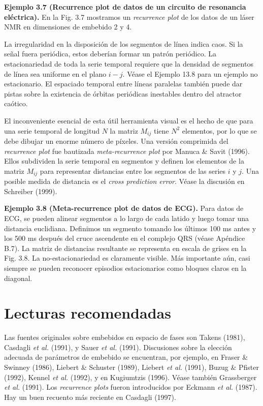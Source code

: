 \documentclass[10pt,a4paper]{book}
\begin{document}
\newpage

\textbf{Ejemplo 3.7 (Recurrence plot de datos de un circuito de resonancia eléctrica).} En la Fig. 3.7 mostramos un \textit{recurrence plot} de los datos de un láser NMR en dimensiones de embebido 2 y 4.

La irregularidad en la disposición de los segmentos de línea indica caos. Si la señal fuera periódica, estos deberían formar un patrón periódico. La estacionariedad de toda la serie temporal requiere que la densidad de segmentos de línea sea uniforme en el plano $i-j$. Véase el Ejemplo 13.8 para un ejemplo no estacionario. El espaciado temporal entre líneas paralelas también puede dar pistas sobre la existencia de órbitas periódicas inestables dentro del atractor caótico.

El inconveniente esencial de esta útil herramienta visual es el hecho de que para una serie temporal de longitud $N$ la matriz $M_{ij}$ tiene $N^2$ elementos, por lo que se debe dibujar un enorme número de píxeles. Una versión comprimida del \textit{recurrence plot} fue bautizada \textit{meta-recurrence plot} por Manuca \& Savit (1996). Ellos subdividen la serie temporal en segmentos y definen los elementos de la matriz $M_{ij}$ para representar distancias entre los segmentos de las series $i$ y $j$. Una posible medida de distancia es el \textit{cross prediction error}. Véase la discusión en Schreiber (1999).

\textbf{Ejemplo 3.8 (Meta-recurrence plot de datos de ECG).} Para datos de ECG, se pueden alinear segmentos a lo largo de cada latido y luego tomar una distancia euclidiana. Definimos un segmento tomando los últimos 100 ms antes y los 500 ms después del cruce ascendente en el complejo QRS (véase Apéndice B.7). La matriz de distancias resultante se representa en escala de grises en la Fig. 3.8. La no-estacionariedad es claramente visible. Más importante aún, casi siempre se pueden reconocer episodios estacionarios como bloques claros en la diagonal.

\section*{Lecturas recomendadas}

Las fuentes originales sobre embebidos en espacio de fases son Takens (1981), Casdagli \textit{et al.} (1991), y Sauer \textit{et al.} (1991). Discusiones sobre la elección adecuada de parámetros de embebido se encuentran, por ejemplo, en Fraser \& Swinney (1986), Liebert \& Schuster (1989), Liebert \textit{et al.} (1991), Buzug \& Pfister (1992), Kennel \textit{et al.} (1992), y en Kugiumtzis (1996). Véase también Grassberger \textit{et al.} (1991). Los \textit{recurrence plots} fueron introducidos por Eckmann \textit{et al.} (1987). Hay un buen recuento más reciente en Casdagli (1997).
\end{document}
